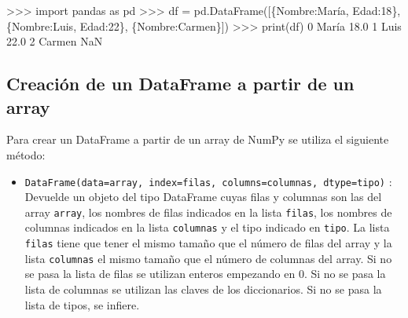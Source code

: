\documentclass[
  spanish,
  a4paper,
]{scrreport}
\newenvironment{Shaded}{\begin{snugshade}}{\end{snugshade}}
\newcommand{\BuiltInTok}[1]{\textcolor[rgb]{0.00,0.23,0.31}{#1}}
\newcommand{\DecValTok}[1]{\textcolor[rgb]{0.68,0.00,0.00}{#1}}
\newcommand{\FloatTok}[1]{\textcolor[rgb]{0.68,0.00,0.00}{#1}}
\newcommand{\ImportTok}[1]{\textcolor[rgb]{0.00,0.46,0.62}{#1}}
\newcommand{\NormalTok}[1]{\textcolor[rgb]{0.00,0.23,0.31}{#1}}
\newcommand{\OperatorTok}[1]{\textcolor[rgb]{0.37,0.37,0.37}{#1}}
\newcommand{\StringTok}[1]{\textcolor[rgb]{0.13,0.47,0.30}{#1}}
\providecommand{\tightlist}{%
  \setlength{\itemsep}{0pt}\setlength{\parskip}{0pt}}
\begin{document}
\begin{Shaded}
\begin{Highlighting}[]
\OperatorTok{\textgreater{}\textgreater{}\textgreater{}} \ImportTok{import}\NormalTok{ pandas }\ImportTok{as}\NormalTok{ pd}
\OperatorTok{\textgreater{}\textgreater{}\textgreater{}}\NormalTok{ df }\OperatorTok{=}\NormalTok{ pd.DataFrame([\{}\StringTok{\textquotesingle{}Nombre\textquotesingle{}}\NormalTok{:}\StringTok{\textquotesingle{}María\textquotesingle{}}\NormalTok{, }\StringTok{\textquotesingle{}Edad\textquotesingle{}}\NormalTok{:}\DecValTok{18}\NormalTok{\}, \{}\StringTok{\textquotesingle{}Nombre\textquotesingle{}}\NormalTok{:}\StringTok{\textquotesingle{}Luis\textquotesingle{}}\NormalTok{, }\StringTok{\textquotesingle{}Edad\textquotesingle{}}\NormalTok{:}\DecValTok{22}\NormalTok{\}, \{}\StringTok{\textquotesingle{}Nombre\textquotesingle{}}\NormalTok{:}\StringTok{\textquotesingle{}Carmen\textquotesingle{}}\NormalTok{\}])}
\OperatorTok{\textgreater{}\textgreater{}\textgreater{}} \BuiltInTok{print}\NormalTok{(df)}
\DecValTok{0}\NormalTok{   María  }\FloatTok{18.0}
\DecValTok{1}\NormalTok{    Luis  }\FloatTok{22.0}
\DecValTok{2}\NormalTok{  Carmen   NaN}
\end{Highlighting}
\end{Shaded}

\subsection{Creación de un DataFrame a partir de un
array}\label{creaciuxf3n-de-un-dataframe-a-partir-de-un-array}

Para crear un DataFrame a partir de un array de NumPy se utiliza el
siguiente método:

\begin{itemize}
\tightlist
\item
  \texttt{DataFrame(data=array,\ index=filas,\ columns=columnas,\ dtype=tipo)}
  : Devuelde un objeto del tipo DataFrame cuyas filas y columnas son las
  del array \texttt{array}, los nombres de filas indicados en la lista
  \texttt{filas}, los nombres de columnas indicados en la lista
  \texttt{columnas} y el tipo indicado en \texttt{tipo}. La lista
  \texttt{filas} tiene que tener el mismo tamaño que el número de filas
  del array y la lista \texttt{columnas} el mismo tamaño que el número
  de columnas del array. Si no se pasa la lista de filas se utilizan
  enteros empezando en 0. Si no se pasa la lista de columnas se utilizan
  las claves de los diccionarios. Si no se pasa la lista de tipos, se
  infiere.
\end{itemize}
\end{document}
